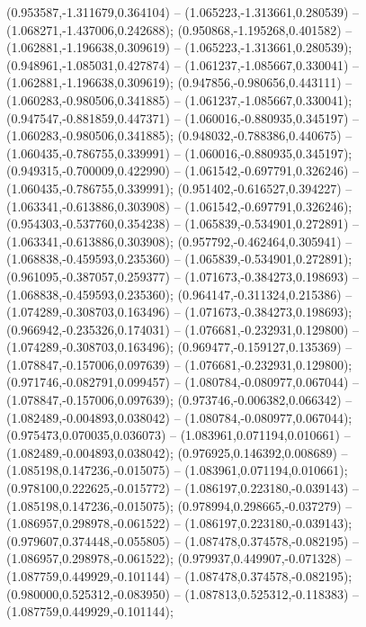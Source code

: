  (0.953587,-1.311679,0.364104) -- (1.065223,-1.313661,0.280539) -- (1.068271,-1.437006,0.242688);
 (0.950868,-1.195268,0.401582) -- (1.062881,-1.196638,0.309619) -- (1.065223,-1.313661,0.280539);
 (0.948961,-1.085031,0.427874) -- (1.061237,-1.085667,0.330041) -- (1.062881,-1.196638,0.309619);
 (0.947856,-0.980656,0.443111) -- (1.060283,-0.980506,0.341885) -- (1.061237,-1.085667,0.330041);
 (0.947547,-0.881859,0.447371) -- (1.060016,-0.880935,0.345197) -- (1.060283,-0.980506,0.341885);
 (0.948032,-0.788386,0.440675) -- (1.060435,-0.786755,0.339991) -- (1.060016,-0.880935,0.345197);
 (0.949315,-0.700009,0.422990) -- (1.061542,-0.697791,0.326246) -- (1.060435,-0.786755,0.339991);
 (0.951402,-0.616527,0.394227) -- (1.063341,-0.613886,0.303908) -- (1.061542,-0.697791,0.326246);
 (0.954303,-0.537760,0.354238) -- (1.065839,-0.534901,0.272891) -- (1.063341,-0.613886,0.303908);
 (0.957792,-0.462464,0.305941) -- (1.068838,-0.459593,0.235360) -- (1.065839,-0.534901,0.272891);
 (0.961095,-0.387057,0.259377) -- (1.071673,-0.384273,0.198693) -- (1.068838,-0.459593,0.235360);
 (0.964147,-0.311324,0.215386) -- (1.074289,-0.308703,0.163496) -- (1.071673,-0.384273,0.198693);
 (0.966942,-0.235326,0.174031) -- (1.076681,-0.232931,0.129800) -- (1.074289,-0.308703,0.163496);
 (0.969477,-0.159127,0.135369) -- (1.078847,-0.157006,0.097639) -- (1.076681,-0.232931,0.129800);
 (0.971746,-0.082791,0.099457) -- (1.080784,-0.080977,0.067044) -- (1.078847,-0.157006,0.097639);
 (0.973746,-0.006382,0.066342) -- (1.082489,-0.004893,0.038042) -- (1.080784,-0.080977,0.067044);
 (0.975473,0.070035,0.036073) -- (1.083961,0.071194,0.010661) -- (1.082489,-0.004893,0.038042);
 (0.976925,0.146392,0.008689) -- (1.085198,0.147236,-0.015075) -- (1.083961,0.071194,0.010661);
 (0.978100,0.222625,-0.015772) -- (1.086197,0.223180,-0.039143) -- (1.085198,0.147236,-0.015075);
 (0.978994,0.298665,-0.037279) -- (1.086957,0.298978,-0.061522) -- (1.086197,0.223180,-0.039143);
 (0.979607,0.374448,-0.055805) -- (1.087478,0.374578,-0.082195) -- (1.086957,0.298978,-0.061522);
 (0.979937,0.449907,-0.071328) -- (1.087759,0.449929,-0.101144) -- (1.087478,0.374578,-0.082195);
 (0.980000,0.525312,-0.083950) -- (1.087813,0.525312,-0.118383) -- (1.087759,0.449929,-0.101144);
